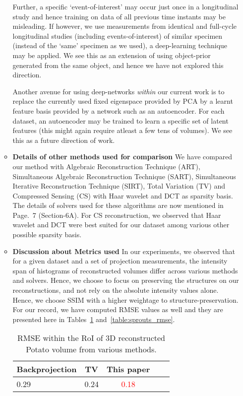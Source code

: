 \documentclass{article}
\begin{document}
\begin{itemize}
\begin{itemize}
  Further, a specific `event-of-interest' may occur just once in a
  longitudinal study and hence training on data of all previous time
  instants may be misleading. If however, we use measurements from
  identical and full-cycle longitudinal studies (including
  events-of-interest) of similar specimen (instead of the `same'
  specimen as we used), a deep-learning technique may be applied. We
  see this as an extension of using object-prior generated from the
  same object, and hence we have not explored this direction.

  Another avenue for using deep-networks \textit{within} our current
  work is to replace the currently used fixed eigenspace provided by
  PCA by a learnt feature basis provided by a network such as an
  autoencoder. For each dataset, an autoencoder may be trained to
  learn a specific set of latent features (this might again require
  atleast a few tens of volumes). We see this as a future direction of
  work.

\item \textbf{Details of other methods used for comparison}
 We have compared our method with Algebraic Reconstruction Technique
 (ART), Simultaneous Algebraic Reconstruction Technique (SART),
 Simultaneous Iterative Reconstruction Technique (SIRT), Total
 Variation (TV) and Compressed Sensing (CS) with Haar wavelet and DCT
 as sparsity basis. The details of solvers used for these
 algorithms are now mentioned in Page.~7 (Section-6A). For CS
 reconstruction, we observed that Haar wavelet and DCT were best
 suited for our dataset among various other possible sparsity basis.

\item \textbf{Discussion about Metrics used}
  In our experiments, we observed that for a given dataset and a set of projection measurements, the intensity span of histograms of reconstructed volumes differ across various methods and solvers. Hence, we choose to focus on preserving the structures on our reconstructions, and not rely on the absolute intensity values alone. Hence, we choose SSIM with a higher weightage to structure-preservation. For our record, we have computed RMSE values as well and they are presented here in Tables~\ref{table:potato_rmse} and~\ref{table:sprouts_rmse}.

\begin{table}[!h]
  \centering
 \caption{RMSE within the RoI of 3D reconstructed Potato volume from various
    methods.}
\begin{tabular}{|l|c|c|c|c|}
\hline 
\textbf{Backprojection} & \textbf{TV} & \textbf{This paper}
\\ \hline  0.29 & 0.24 & \textcolor{red}{0.18}
\\ \hline
\end{tabular}
\label{table:potato_rmse}
\end{table}


\end{itemize}
\end{itemize}
\end{document}
